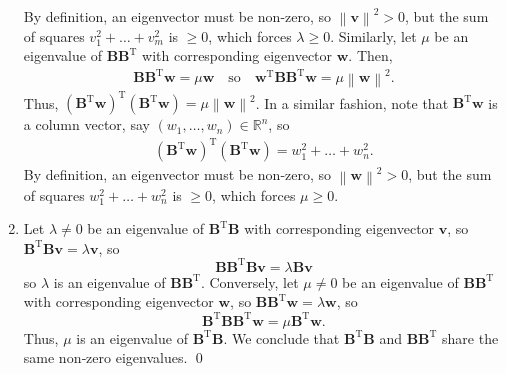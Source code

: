 \documentclass[12pt]{article}
\begin{document}
\begin{enumerate}[label=\textbf{(\alph*)}]
\begin{align*}
   \end{align*}
    By definition, an eigenvector must be non-zero, so $\left\|\mathbf{v}\right\|^2>0$, but the sum of squares $v_1^2+\ldots+v_m^2$ is $\ge 0$, which forces $\lambda\ge 0$.
    \newline
    \newline Similarly, let $\mu$ be an eigenvalue of $\mathbf{BB}^\text{T}$ with corresponding eigenvector $\mathbf{w}$. Then, \begin{align*}
        \mathbf{BB}^\text{T}\mathbf{w}=\mu\mathbf{w}\quad\text{so}\quad \mathbf{w}^\text{T}\mathbf{BB}^\text{T}\mathbf{w}=\mu\left\|\mathbf{w}\right\|^2.
    \end{align*}
    Thus, $\left(\mathbf{B}^\text{T}\mathbf{w}\right)^\text{T}\left(\mathbf{B}^\text{T}\mathbf{w}\right)=\mu\left\|\mathbf{w}\right\|^2$. In a similar fashion, note that $\mathbf{B}^\text{T}\mathbf{w}$ is a column vector, say $\left(w_1,\ldots,w_n\right)\in\mathbb{R}^n$, so \begin{align*}
        \left(\mathbf{B}^\text{T}\mathbf{w}\right)^\text{T}\left(\mathbf{B}^\text{T}\mathbf{w}\right)=w_1^2+\ldots+w_n^2.
    \end{align*}
    By definition, an eigenvector must be non-zero, so $\left\|\mathbf{w}\right\|^2>0$, but the sum of squares $w_1^2+\ldots+w_n^2$ is $\ge 0$, which forces $\mu\ge 0$.
    \item Let $\lambda \ne 0$ be an eigenvalue of $\mathbf{B}^\text{T}\mathbf{B}$ with corresponding eigenvector $\mathbf{v}$, so $\mathbf{B}^\text{T}\mathbf{B}\mathbf{v}= \lambda\mathbf{v}$, so \[\mathbf{BB}^\text{T}\mathbf{Bv}=\lambda\mathbf{Bv}\]
    so $\lambda$ is an eigenvalue of $\mathbf{BB}^\text{T}$. Conversely, let $\mu\ne 0$ be an eigenvalue of $\mathbf{BB}^\text{T}$ with corresponding eigenvector $\mathbf{w}$, so $\mathbf{BB}^\text{T}\mathbf{w}=\lambda\mathbf{w}$, so \[\mathbf{B}^\text{T}\mathbf{BB}^\text{T}\mathbf{w}=\mu\mathbf{B}^\text{T}\mathbf{w}.\]
    Thus, $\mu$ is an eigenvalue of $\mathbf{B}^\text{T}\mathbf{B}$. We conclude that $\mathbf{B}^\text{T}\mathbf{B}$ and $\mathbf{BB}^{\text{T}}$ share the same non‑zero eigenvalues. \qed 
\end{enumerate} 
\end{document}
